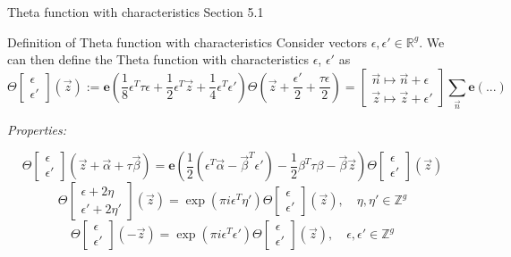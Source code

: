 \documentclass[11pt,aspectratio=169]{beamer}
\newcommand{\ee}[0]{\mathbf{e}}
\begin{document}
\begin{frame}{Theta function with characteristics}{\tiny \cite{Ber06} Section 5.1}
    \begin{block}{Definition of Theta function with characteristics}
        Consider vectors $ \epsilon ,  \epsilon' \in \mathbb R^g$.
        We can then define the Theta function with characteristics $ \epsilon$, $ \epsilon'$ as
        \[\Theta\begin{bmatrix} \epsilon \\  \epsilon'\end{bmatrix}(\vec z) := 
        \ee\left(\frac{1}{8}\epsilon^T \tau \epsilon + \frac{1}{2}\epsilon^T \vec z + \frac{1}{4}\epsilon^T  \epsilon'\right)
        \Theta\left(\vec z + \frac{\epsilon'}{2}+\frac{\tau\epsilon}{2}\right) = \begin{bmatrix}\vec n \mapsto \vec n+\epsilon \\ \vec z \mapsto \vec z + \epsilon' \end{bmatrix} \sum_{\vec n} \ee(...)\] 
    \end{block}
    \emph{Properties:}

    \[\Theta\begin{bmatrix}\epsilon \\ \epsilon'\end{bmatrix}(\vec z + \vec \alpha + \tau \vec \beta) =
    \ee\left(\frac{1}{2}(\epsilon^T \vec \alpha - \vec \beta^T \epsilon') - \frac{1}{2} \beta^T \tau \beta - \vec \beta \vec z\right)
    \Theta\begin{bmatrix}\epsilon \\ \epsilon'\end{bmatrix}(\vec z)\]
    \[\Theta\begin{bmatrix}\epsilon + 2\eta \\ \epsilon' + 2\eta' \end{bmatrix}(\vec z) = \exp(\pi i \epsilon^T \eta')
    \Theta\begin{bmatrix}\epsilon \\ \epsilon'\end{bmatrix}(\vec z) , \quad \eta,\eta' \in \mathbb Z^g\]
    \[\Theta\begin{bmatrix}\epsilon \\ \epsilon'\end{bmatrix}(-\vec z) = \exp(\pi i \epsilon^T \epsilon') \Theta\begin{bmatrix}\epsilon \\ \epsilon'\end{bmatrix}(\vec z) , \quad \epsilon,\epsilon' \in \mathbb Z^g\]
\end{frame}
\end{document}
